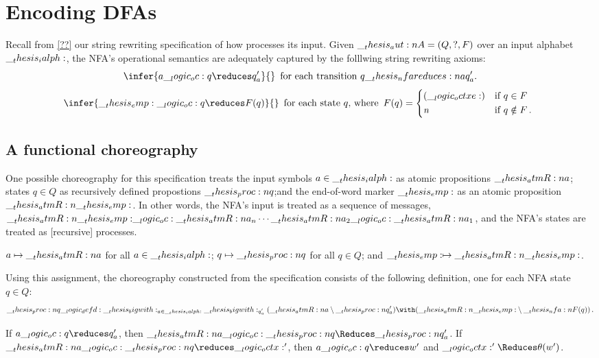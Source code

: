 \section{Encoding \aclp*{DFA}}

Recall from \cref{??} our string rewriting specification of how  processes its input.
Given  $\__thesis_aut:n {A} = (Q, ?, F)$ over an input alphabet $\__thesis_ialph:$, the \ac{NFA}'s operational semantics are adequately captured by the folllwing string rewriting axioms:
\begin{equation*}
  \infer{a \oc q \reduces q'_a}{}
  \enspace\text{for each transition $q \nfareduces[a] q'_a$.}
\end{equation*}
\begin{equation*}
  \infer{\emp \oc q \reduces F(q)}{}
  \enspace\text{for each state $q$, where}\enspace
  F(q) = \begin{cases*}
           (\octxe) & if $q \in F$ \\
           \symrej & if $q \notin F$\,.
         \end{cases*}
\end{equation*}

\clearpage
\subsection{A functional choreography}

One possible choreography for this specification treats the input symbols $a \in \__thesis_ialph:$ as atomic propositions $\__thesis_atmR:n {a}$; states $q \in Q$ as recursively defined propostions $\__thesis_proc:n {q}$;and the end-of-word marker $\__thesis_emp:$ as an atomic proposition $\__thesis_atmR:n {\__thesis_emp:}$.
In other words, the \ac{NFA}'s input is treated as a sequence of messages, $\__thesis_atmR:n {\__thesis_emp:} \__logic_oc: \__thesis_atmR:n {a}_n \dotsm \__thesis_atmR:n {a}_2 \__logic_oc: \__thesis_atmR:n {a}_1$, and the \ac{NFA}'s states are treated as [recursive] processes.

$a \mapsto \__thesis_atmR:n {a}$ for all $a \in \__thesis_ialph:$; $q \mapsto \__thesis_proc:n {q}$ for all $q \in Q$; and $\__thesis_emp: \mapsto \__thesis_atmR:n {\__thesis_emp:}$.

Using this assignment, the choreography constructed from the specification consists of the following definition, one for each \ac{NFA} state $q \in Q$:
\begin{equation*}
  \proc{q} \defd \bigwith_{a \in \ialph} \bigwith_{q\smash{'_a}} (\atmR{a} \limp \proc{q}'_a) \with (\atmR{\emp} \limp \nfa{F}(q))
  \,.
\end{equation*}

\begin{corollary}
  If $a \oc q \reduces q'_a$, then $\atmR{a} \oc \proc{q} \Reduces \proc{q}'_a$.
  If $\atmR{a} \oc \proc{q} \reduces \octx'$, then $a \oc q \reduces w'$ and $\octx' \Reduces \theta(w')$.
\end{corollary}

